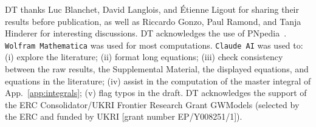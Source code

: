 \documentclass[prd,superscriptaddress,preprintnumbers,tightenlines,nofootinbib, eqsecnum]{revtex4-2}
\begin{document}
\acknowledgments
DT thanks Luc Blanchet, David Langlois, and \'{E}tienne Ligout for sharing their results  before publication, as well as
Riccardo Gonzo, Paul Ramond, and Tanja Hinderer for interesting discussions. DT acknowledges the use of  PNpedia~\cite{PNpedia}. \texttt{Wolfram Mathematica} was used for most computations. \texttt{Claude AI}  was used to: (i) explore the literature; (ii)  format long equations; (iii) check consistency between the raw results, the Supplemental Material, the displayed equations, and equations in the literature; (iv) assist in the computation of the master integral of App.~\ref{app:integrals}; (v) flag typos in the draft. 
DT acknowledges the support of the ERC Consolidator/UKRI Frontier Research Grant GWModels (selected by the ERC and funded by UKRI [grant number EP/Y008251/1]). 
\appendix
\end{document}
